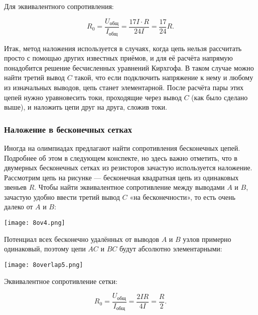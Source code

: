 \documentclass[12pt, a4paper]{article}%
\begin{document}
Для эквивалентного сопротивления:

\[
R_0 = \frac{U_\text{общ}}{I_\text{общ}} = \frac{17I\cdot R}{24I} = \frac{17}{24}R.
\]


Итак, метод наложения используется в случаях, когда цепь нельзя рассчитать просто с помощью других известных приёмов, и для её расчёта напрямую понадобится решение бесчисленных уравнений Кирхгофа. 
В таком случае можно найти третий вывод $C$ такой, что если подключить напряжение к нему и любому из изначальных выводов, цепь станет элементарной. После расчёта пары этих цепей нужно уравновесить токи, проходящие через вывод $C$ (как было сделано выше), и наложить цепи друг на друга, сложив токи. 

\subsubsection*{Наложение в бесконечных сетках}

Иногда на олимпиадах предлагают найти сопротивления бесконечных цепей. Подробнее об этом в следующем конспекте, но здесь 
важно отметить, что в двумерных бесконечных сетках из резисторов зачастую используется наложение. Рассмотрим цепь на рисунке 
--- бесконечная квадратная цепь из одинаковых звеньев $R$. Чтобы найти эквивалентное сопротивление между выводами $A$ и $B$, 
зачастую удобно ввести третий вывод $C$ «на бесконечности», то есть очень далеко от $A$ и $B$:

\begin{center}
\texttt{[image: 8ov4.png]}
\label{fig:mpr}
\end{center}

Потенциал всех бесконечно удалённых от выводов $A$ и $B$ узлов примерно одинаковый, поэтому цепи $AC$ и $BC$ будут абсолютно элементарными:

\begin{center}
\texttt{[image: 8overlap5.png]}
\label{fig:mpr}
\end{center}

Эквивалентное сопротивление сетки:

\[
R_0 = \frac{U_\text{общ}}{I_\text{общ}} = \frac{2IR}{4I} = \frac{R}{2}.
\]
\end{document}
